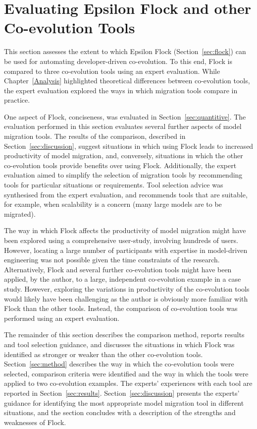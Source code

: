 
\section[Evaluating Epsilon Flock and other Co-evolution Tools][Evaluating Flock and other Co-evolution Tools]{Evaluating Epsilon Flock and other Co-evolution Tools}
\label{sec:collaborative_comparison}
This section assesses the extent to which Epsilon Flock (Section~\ref{sec:flock}) can be used for automating developer-driven co-evolution. To this end, Flock is compared to three co-evolution tools using an expert evaluation. While Chapter~\ref{Analysis} highlighted theoretical differences between co-evolution tools, the expert evaluation explored the ways in which migration tools compare in practice.

One aspect of Flock, conciseness, was evaluated in Section~\ref{sec:quantitive}. The evaluation performed in this section evaluates several further aspects of model migration tools. The results of the comparison, described in Section~\ref{sec:discussion}, suggest situations in which using Flock leads to increased productivity of model migration, and, conversely, situations in which the other co-evolution tools provide benefits over using Flock. Additionally, the expert evaluation aimed to  simplify the selection of migration tools by recommending tools for particular situations or requirements. Tool selection advice was synthesised from the expert evaluation, and recommends tools that are suitable, for example, when scalability is a concern (many large models are to be migrated).

The way in which Flock affects the productivity of model migration might have been explored using a comprehensive user-study, involving hundreds of users. However, locating a large number of participants with expertise in model-driven engineering was not possible given the time constraints of the research. Alternatively, Flock and several further co-evolution tools might have been applied, by the author, to a large, independent co-evolution example in a case study. However, exploring the variations in productivity of the co-evolution tools would likely have been challenging as the author is obviously more familiar with Flock than the other tools. Instead, the comparison of co-evolution tools was performed using an expert evaluation.

The remainder of this section describes the comparison method, reports results and tool selection guidance, and discusses the situations in which Flock was identified as stronger or weaker than the other co-evolution tools. Section~\ref{sec:method} describes the way in which the co-evolution tools were selected, comparison criteria were identified and the way in which the tools were applied to two co-evolution examples. The experts' experiences with each tool are reported in Section~\ref{sec:results}. Section~\ref{sec:discussion} presents the experts' guidance for identifying the most appropriate model migration tool in different situations, and the section concludes with a description of the strengths and weaknesses of Flock.


